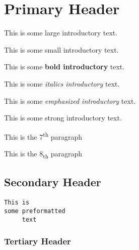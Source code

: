 \documentclass[12pt]{article}
\begin{document}
\section{Primary Header}This is some {\Large large introductory} text.

This is some {\scriptsize small introductory} text.

This is some \textbf{bold introductory} text.

This is some \textit{italics introductory} text.

This is some \emph{emphasized introductory} text.

This is some \textmd{strong introductory} text.

This is the 7\textsuperscript{th} paragraph

This is the 8\textsubscript{th} paragraph

\subsection{Secondary Header}\begin{verbatim}This is
some preformatted
     text\end{verbatim}
\subsubsection{Tertiary Header}
\end{document}
